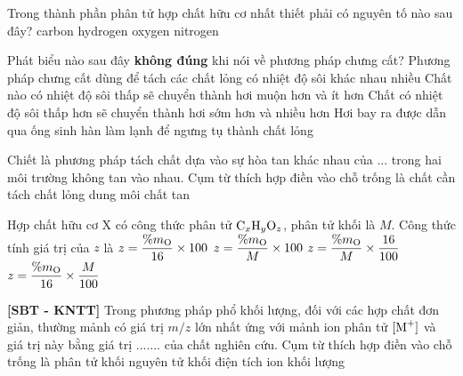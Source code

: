 \documentclass[12pt,a4paper]{article}
\begin{document}
\begin{ex}
Trong thành phần phân tử hợp chất hữu cơ nhất thiết phải có nguyên tố nào sau đây?
\choice
{\True carbon}
{hydrogen}
{oxygen}
{nitrogen}

\end{ex}

\begin{ex}
Phát biểu nào sau đây \textbf{không đúng} khi nói về phương pháp chưng cất?
\choice
{Phương pháp chưng cất dùng để tách các chất lỏng có nhiệt độ sôi khác nhau nhiều}
{\True Chất nào có nhiệt độ sôi thấp sẽ chuyển thành hơi muộn hơn và ít hơn}
{Chất có nhiệt độ sôi thấp hơn sẽ chuyển thành hơi sớm hơn và nhiều hơn}
{Hơi bay ra được dẫn qua ống sinh hàn làm lạnh để ngưng tụ thành chất lỏng}

\end{ex}

\begin{ex}
Chiết là phương pháp tách chất dựa vào sự hòa tan khác nhau của ... trong hai môi trường không tan vào nhau. Cụm từ thích hợp điền vào chỗ trống là
\choice
{\True chất cần tách}
{chất lỏng}
{dung môi}
{chất tan}

\end{ex}

\begin{ex}
Hợp chất hữu cơ X có công thức phân tử $\ce{C_xH_yO_z}$, phân tử khối là $M$. Công thức tính giá trị của $z$ là
\choice
{$z = \dfrac{\%m_{\ce{O}}}{16} \times 100$}
{$z = \dfrac{\%m_{\ce{O}}}{M} \times 100$}
{$z = \dfrac{\%m_{\ce{O}}}{M} \times \dfrac{16}{100}$}
{\True $z = \dfrac{\%m_{\ce{O}}}{16} \times \dfrac{M}{100}$}

\end{ex}

\begin{ex}
\textbf{[SBT - KNTT]} Trong phương pháp phổ khối lượng, đối với các hợp chất đơn giản, thường mảnh có giá trị $m/z$ lớn nhất ứng với mảnh ion phân tử $[\ce{M+}]$ và giá trị này bằng giá trị ....... của chất nghiên cứu. Cụm từ thích hợp điền vào chỗ trống là
\choice
{\True phân tử khối}
{nguyên tử khối}
{điện tích ion}
{khối lượng}

\end{ex}
\end{document}
